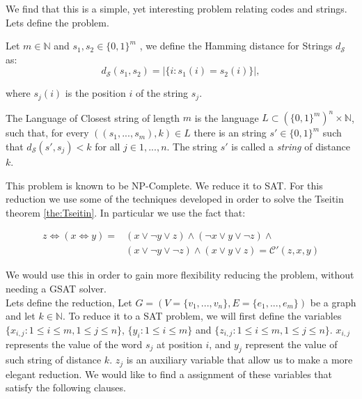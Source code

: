 We find that this is a simple, yet interesting problem relating codes and strings. Lets define the problem.

\begin{definition}
Let $m\in\mathbb{N}$ and $s_1,s_2\in \{0,1\}^m$ , we define the Hamming distance for Strings $d_\mathcal{S}$ as:
$$d_{\mathcal{S}} ( s_1,s_2 ) = |\{ i : s_1(i) = s_2(i)\}|,$$

where $s_j(i)$ is the position $i$ of the string $s_j$. 
\end{definition}

\begin{definition}
The Language of Closest string of length $m$ is the language $L\subset \left (\{0,1\}^m \right )^n \times \mathbb{N}$, such that, for every $((s_1,...,s_m), k)\in L$ there is an string $s' \in \{0,1\}^m$ such that $d_\mathcal{S}(s', s_j) <k $ for all $j \in 1,...,n$.  The string $s'$ is called a \emph{string} of distance $k$.
\end{definition}

This problem is known to be NP-Complete\cite{lanctot2003distinguishing}. We reduce it to SAT. For this reduction we use some of the techniques developed in order to solve the Tseitin theorem \ref{the:Tseitin}. In particular we use the fact that:

\begin{equation} \label{aunnosehadormio}
\begin{split}
    z \iff( x \iff y ) =& (x \lor  \neg y \lor z) \land (\neg x \lor y \lor \neg z) \land\\
    &  (x \lor \neg y \lor \neg z) \land (x \lor y \lor z) = \mathcal{C'} (z,x,y)
\end{split}
\end{equation}


We would use this in order to gain more flexibility reducing the problem, without needing a GSAT solver.\\

Lets define the reduction, Let $G = ( V = \{ v_1 , ..., v_n\} , E =\{ e_1 , ..., e_m\})$ be a graph and let $k \in \mathbb{N}$. To reduce it to a SAT problem, we will first define the variables$ \{ x_{i,j} : 1 \le i \le m, 1 \le j \le n \}$, $\{y_i : 1 \le i \le m\}$ and $\{z_{i,j} : 1\le i \le m, 1 \le j \le n\}$. $x_{i,j}$ represents the value of the word $s_j$ at position $i$, and $y_j$ represent the value of such string of distance $k$. $z_j$ is an auxiliary variable that allow us to make a more elegant reduction. We would like to find a assignment of these variables that satisfy the following clauses.

